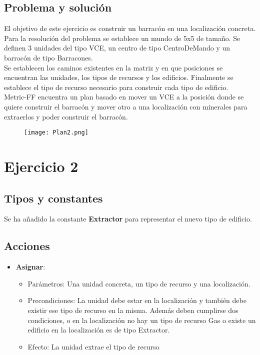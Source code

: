 \subsection{Problema y solución}
El objetivo de este ejercicio es construir un barracón en una localización concreta.\\
Para la resolución del problema se establece un mundo de 5x5 de tamaño. Se definen 3 unidades del tipo VCE, un centro de tipo CentroDeMando y un barracón de tipo Barracones.\\
Se establecen los caminos existentes en la matriz y en que posiciones se encuentran las unidades, los tipos de recursos y los edificios. Finalmente se establece el tipo de recurso necesario para construir cada tipo de edificio.\\
Metric-FF encuentra un plan basado en mover un VCE a la posición donde se quiere construir el barracón y mover otro a una localización con minerales para extraerlos y poder construir el barracón.
\begin{figure}[H]
   \centering
   \texttt{[image: Plan2.png]}
\end{figure}

\section{Ejercicio 2}
\subsection{Tipos y constantes}
Se ha añadido la constante \textbf{Extractor} para representar el nuevo tipo de edificio.
\subsection{Acciones}
\begin{itemize}
   \item \textbf{Asignar}:
   \begin{itemize}
      \item Parámetros: Una unidad concreta, un tipo de recurso y una localización.
      \item Precondiciones: La unidad debe estar en la localización y también debe existir ese tipo de recurso en la misma. Además deben cumplirse dos condiciones, o en la localización no hay un tipo de recurso Gas o existe un edificio en la localización es de tipo Extractor.
      \item Efecto: La unidad extrae el tipo de recurso
   \end{itemize}
\end{itemize}
